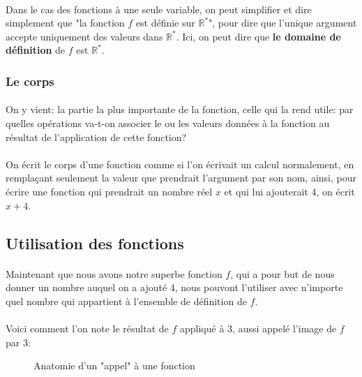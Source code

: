 \documentclass[a4paper]{book}
\begin{document}
    \paragraph{}
    Dans le cas des fonctions à une seule variable, on peut simplifier et dire simplement que "la fonction $f$ est définie sur $\mathds{R}^\ast$", pour dire que l'unique argument accepte uniquement des valeurs dans $\mathds{R}^\ast$. Ici, on peut dire que \textbf{le domaine de définition} de $f$ est $\mathds{R}^\ast$.
    
    
    \subsubsection{Le corps}
    \paragraph{}
    On y vient: la partie la plus importante de la fonction, celle qui la rend utile: par quelles opérations va-t-on associer le ou les valeurs données à la fonction au résultat de l'application de cette fonction?
    \paragraph{}
    On écrit le corps d'une fonction comme si l'on écrivait un calcul normalement, en remplaçant seulement la valeur que prendrait l'argument par son nom, ainsi, pour écrire une fonction qui prendrait un nombre réel $x$ et qui lui ajouterait 4, on écrit $x + 4$.
    
    \subsection{Utilisation des fonctions}
    \paragraph{}
    Maintenant que nous avons notre superbe fonction $f$, qui a pour but de nous donner un nombre auquel on a ajouté 4, nous pouvont l'utiliser avec n'importe quel nombre qui appartient à l'ensemble de définition de $f$. 
    \paragraph{}
    Voici comment l'on note le résultat de $f$ appliqué à 3, aussi appelé l'image de $f$ par 3:
          \begin{figure}[h]
        \centering
        \caption{Anatomie d'un "appel" à une fonction}
        \label{fig:function_call_anatomy}
    \end{figure}
    
\end{document}
